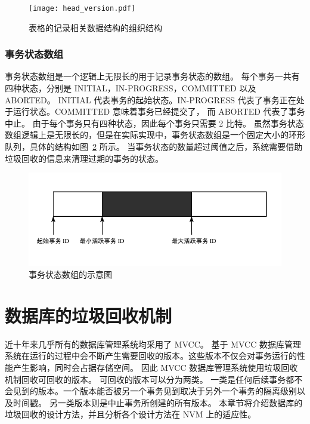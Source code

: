 \begin{figure}
    \centering
    \texttt{[image: head\_version.pdf]}
    \caption{表格的记录相关数据结构的组织结构}
    \label{fig:table}
\end{figure}

\subsubsection{事务状态数组}

事务状态数组是一个逻辑上无限长的用于记录事务状态的数组。
每个事务一共有四种状态，分别是 INITIAL，IN-PROGRESS，COMMITTED 以及 ABORTED。
INITIAL 代表事务的起始状态。IN-PROGRESS 代表了事务正在处于运行状态。COMMITTED 意味着事务已经提交了，
而 ABORTED 代表了事务中止。
由于每个事务只有四种状态，因此每个事务只需要 2 比特。
虽然事务状态数组逻辑上是无限长的，但是在实际实现中，事务状态数组是一个固定大小的环形队列，具体的结构如图~\ref{fig:clog} 所示。
当事务状态的数量超过阈值之后，系统需要借助垃圾回收的信息来清理过期的事务的状态。

\begin{figure}
    \centering
    \includegraphics[width=1\linewidth]{figures/clog.pdf}
    \caption{事务状态数组的示意图}
    \label{fig:clog}
\end{figure}




\section{数据库的垃圾回收机制}

近十年来几乎所有的数据库管理系统均采用了 MVCC。
基于 MVCC 数据库管理系统在运行的过程中会不断产生需要回收的版本。这些版本不仅会对事务运行的性能产生影响，同时会占据存储空间。
因此 MVCC 数据库管理系统使用垃圾回收机制回收可回收的版本。
可回收的版本可以分为两类。
一类是任何后续事务都不会见到的版本。一个版本能否被另一个事务见到取决于另外一个事务的隔离级别以及时间戳。
另一类版本则是中止事务所创建的所有版本。
本章节将介绍数据库的垃圾回收的设计方法，并且分析各个设计方法在 NVM 上的适应性。

